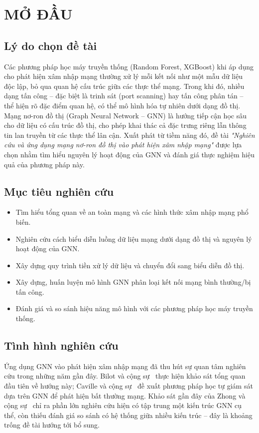 \chapter*{MỞ ĐẦU}

\section*{Lý do chọn đề tài}

Các phương pháp học máy truyền thống (Random Forest, XGBoost) khi áp dụng cho phát hiện xâm nhập mạng thường xử lý mỗi kết nối như một mẫu dữ liệu độc lập, bỏ qua quan hệ cấu trúc giữa các thực thể mạng. Trong khi đó, nhiều dạng tấn công -- đặc biệt là trinh sát (port scanning) hay tấn công phân tán -- thể hiện rõ đặc điểm quan hệ, có thể mô hình hóa tự nhiên dưới dạng đồ thị. Mạng nơ-ron đồ thị (Graph Neural Network -- GNN) là hướng tiếp cận học sâu cho dữ liệu có cấu trúc đồ thị, cho phép khai thác cả đặc trưng riêng lẫn thông tin lan truyền từ các thực thể lân cận. Xuất phát từ tiềm năng đó, đề tài \textit{"Nghiên cứu và ứng dụng mạng nơ-ron đồ thị vào phát hiện xâm nhập mạng"} được lựa chọn nhằm tìm hiểu nguyên lý hoạt động của GNN và đánh giá thực nghiệm hiệu quả của phương pháp này.

\section*{Mục tiêu nghiên cứu}

\begin{itemize}
  \item Tìm hiểu tổng quan về an toàn mạng và các hình thức xâm nhập mạng phổ biến.
  \item Nghiên cứu cách biểu diễn luồng dữ liệu mạng dưới dạng đồ thị và nguyên lý hoạt động của GNN.
  \item Xây dựng quy trình tiền xử lý dữ liệu và chuyển đổi sang biểu diễn đồ thị.
  \item Xây dựng, huấn luyện mô hình GNN phân loại kết nối mạng bình thường/bị tấn công.
  \item Đánh giá và so sánh hiệu năng mô hình với các phương pháp học máy truyền thống.
\end{itemize}

\section*{Tình hình nghiên cứu}

Ứng dụng GNN vào phát hiện xâm nhập mạng đã thu hút sự quan tâm nghiên cứu trong những năm gần đây. Bilot và cộng sự~\cite{bilot2023gnnids} thực hiện khảo sát tổng quan đầu tiên về hướng này; Caville và cộng sự~\cite{caville2023anomale} đề xuất phương pháp học tự giám sát dựa trên GNN để phát hiện bất thường mạng. Khảo sát gần đây của Zhong và cộng sự~\cite{zhong2024survey} chỉ ra phần lớn nghiên cứu hiện có tập trung một kiến trúc GNN cụ thể, còn thiếu đánh giá so sánh có hệ thống giữa nhiều kiến trúc -- đây là khoảng trống đề tài hướng tới bổ sung.

